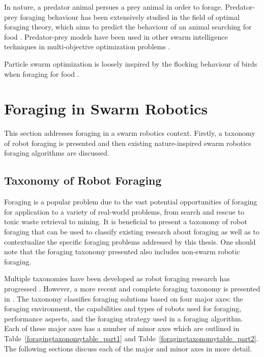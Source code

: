 In nature, a predator animal persues a prey animal in order to forage. Predator-prey foraging behaviour has been extensively studied in the field of optimal foraging theory, which aims to predict the behaviour of an animal searching for food \cite{charnov1976optimal}. Predator-prey models have been used in other swarm intelligence techniques in multi-objective optimization problems \cite{nolfi1998coevolving}.

Particle swarm optimization is loosely inspired by the flocking behaviour of birds when foraging for food \cite{kennedy1995particle}.

\section{Foraging in Swarm Robotics}
\label{foraging:foraginginswarmrobotics}
This section addresses foraging in a swarm robotics context. Firstly, a taxonomy of robot foraging is presented and then existing nature-inspired swarm robotics foraging algorithms are discussed.

\subsection{Taxonomy of Robot Foraging}
\label{sec:second:taxonomy}

Foraging is a popular problem due to the vast potential opportunities of foraging for application to a variety of real-world problems, from search and rescue \cite{jennings1997cooperative} to toxic waste retrieval to mining. It is beneficial to present a taxonomy of robot foraging that can be used to classify existing research about foraging as well as to contextualize the specific foraging problems addressed by this thesis. One should note that the foraging taxonomy presented also includes non-swarm robotic foraging.

Multiple taxonomies have been developed as robot foraging research has progressed \cite{oster1978caste,ostergaard2001emergent}. However, a more recent and complete foraging taxonomy is presented in \cite{winfield2009foraging}. The taxonomy classifies foraging solutions based on four major axes: the foraging environment, the capabilities and types of robots used for foraging, performance aspects, and the foraging strategy used in a foraging algorithm. Each of these major axes has a number of minor axes which are outlined in Table~\ref{foragingtaxonomytable_part1} and Table~\ref{foragingtaxonomytable_part2}.  The following sections discuss each of the major and minor axes in more detail.

